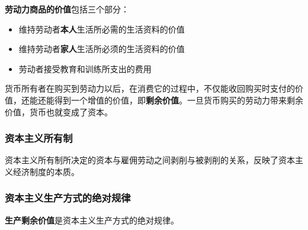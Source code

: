\documentclass[12pt, a4paper, oneside]{ctexart}
\begin{document}
\textbf{劳动力商品的价值}包括三个部分：
\begin{itemize}
  \item 维持劳动者\textbf{本人}生活所必需的生活资料的价值
  \item 维持劳动者\textbf{家人}生活所必须的生活资料的价值
  \item 劳动者接受教育和训练所支出的费用
\end{itemize}

货币所有者在购买到劳动力以后，在消费它的过程中，不仅能收回购买时支付的价值，还能还能得到一个增值的价值，即\textbf{剩余价值}。一旦货币购买的劳动力带来剩余价值，货币也就变成了资本。

\subsubsection{资本主义所有制}

资本主义所有制所决定的资本与雇佣劳动之间剥削与被剥削的关系，反映了资本主义经济制度的本质。

\subsubsection{资本主义生产方式的绝对规律}

\textbf{生产剩余价值}是资本主义生产方式的绝对规律。
\end{document}

